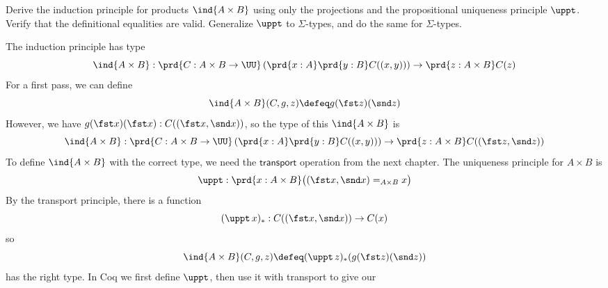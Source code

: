 Derive the induction principle for products $\ind{A \times B}$ using only the
projections and the propositional uniqueness principle $\uppt$.  Verify that
the definitional equalities are valid.  Generalize $\uppt$ to $\Sigma$-types,
and do the same for $\Sigma$-types. \begin{coqdoccode}
\coqdocemptyline
\end{coqdoccode}
\soln 
The induction principle has type
\[
\ind{A\times B} : \prd{C: A\times B \to \UU}\left(\prd{x:A}\prd{y:B}C((x,
y))\right) \to \prd{z:A\times B}C(z)
\]
For a first pass, we can define
\[
\ind{A\times B}(C, g, z)
\defeq
g(\fst z)(\snd z)
\]
However, we have $g(\fst x)(\fst x) : C((\fst x, \snd x))$, so the type of this
$\ind{A \times B}$ is
\[
\ind{A\times B} : \prd{C: A\times B \to \UU}\left(\prd{x:A}\prd{y:B}C((x,
y))\right) \to \prd{z:A\times B}C((\fst z, \snd z))
\]
To define $\ind{A \times B}$ with the correct type, we need the
$\mathsf{transport}$ operation from the next chapter.  The uniqueness principle
for $A \times B$ is
\[
\uppt : \prd{x : A \times B} \big((\fst x, \snd x) =_{A \times B} x\big)
\]
By the transport principle, there is a function
\[
(\uppt\, x)_{*} : C((\fst x, \snd x)) \to C(x)
\]
so
\[
\ind{A \times B}(C, g, z)
\defeq
(\uppt\, z)_{*}(g(\fst z)(\snd z))
\]
has the right type.
In Coq we first define $\uppt$, then use it with transport to give our
